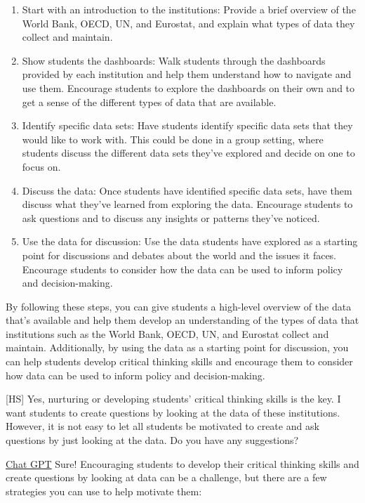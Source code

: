 \documentclass[
]{bxjsbook}
\providecommand{\tightlist}{%
  \setlength{\itemsep}{0pt}\setlength{\parskip}{0pt}}
\theoremstyle{definition}
\theoremstyle{definition}
\theoremstyle{definition}
\theoremstyle{definition}
\theoremstyle{remark}
\begin{document}
\begin{enumerate}
\def\labelenumi{\arabic{enumi}.}
\tightlist
\item
  Start with an introduction to the institutions: Provide a brief overview of the World Bank, OECD, UN, and Eurostat, and explain what types of data they collect and maintain.
\item
  Show students the dashboards: Walk students through the dashboards provided by each institution and help them understand how to navigate and use them. Encourage students to explore the dashboards on their own and to get a sense of the different types of data that are available.
\item
  Identify specific data sets: Have students identify specific data sets that they would like to work with. This could be done in a group setting, where students discuss the different data sets they've explored and decide on one to focus on.
\item
  Discuss the data: Once students have identified specific data sets, have them discuss what they've learned from exploring the data. Encourage students to ask questions and to discuss any insights or patterns they've noticed.
\item
  Use the data for discussion: Use the data students have explored as a starting point for discussions and debates about the world and the issues it faces. Encourage students to consider how the data can be used to inform policy and decision-making.
\end{enumerate}

By following these steps, you can give students a high-level overview of the data that's available and help them develop an understanding of the types of data that institutions such as the World Bank, OECD, UN, and Eurostat collect and maintain. Additionally, by using the data as a starting point for discussion, you can help students develop critical thinking skills and encourage them to consider how data can be used to inform policy and decision-making.

{[}HS{]} Yes, nurturing or developing students' critical thinking skills is the key. I want students to create questions by looking at the data of these institutions. However, it is not easy to let all students be motivated to create and ask questions by just looking at the data. Do you have any suggestions?

\protect\hyperlink{chatgpt}{Chat GPT} Sure! Encouraging students to develop their critical thinking skills and create questions by looking at data can be a challenge, but there are a few strategies you can use to help motivate them:
\end{document}
